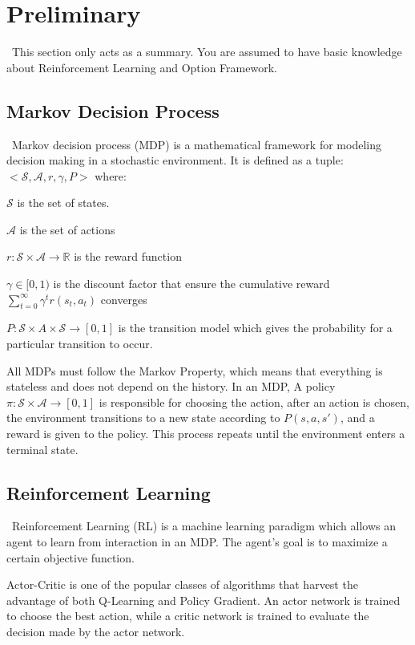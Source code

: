 \documentclass{article}
\begin{document}
	\section{Preliminary}
	\qquad \ This section only acts as a summary. You are assumed to have basic knowledge about Reinforcement Learning and Option Framework.
	\subsection*{Markov Decision Process}
	\qquad \ Markov decision process (MDP) \cite{sutton2018reinforcement} is a mathematical framework for modeling decision making in a stochastic environment. It is defined as a tuple: $<\mathcal{S}, \mathcal{A}, r, \gamma, P>$ where:
	
	$\mathcal{S}$ is the set of states.
	
	$\mathcal{A}$ is the set of actions
	
	$r : \mathcal{S} \times \mathcal{A} \rightarrow \mathbb{R}$ is the reward function
	
	$\gamma \in [0,1)$ is the discount factor that ensure the cumulative reward $\sum_{t=0}^{\infty} \gamma^t r(s_t, a_t)$ converges
	
	$P : \mathcal{S} \times A \times \mathcal{S} \rightarrow [0,1]$ is the transition model which gives the probability for a particular transition to occur.
	
	\quad All MDPs must follow the Markov Property, which means that everything is stateless and does not depend on the history. In an MDP, A policy $\pi : \mathcal{S} \times \mathcal{A} \rightarrow [0,1]$ is responsible for choosing the action, after an action is chosen, the environment transitions to a new state according to $P(s,a,s')$, and a reward is given to the policy. This process repeats until the environment enters a terminal state.
	\subsection*{Reinforcement Learning}
	\qquad \ Reinforcement Learning (RL) \cite{sutton2018reinforcement} is a machine learning paradigm which allows an agent to learn from interaction in an MDP. The agent's goal is to maximize a certain objective function.
	
	\quad Actor-Critic \cite{Konda00actor-criticalgorithms} is one of the popular classes of algorithms that harvest the advantage of both Q-Learning and Policy Gradient. An actor network is trained to choose the best action, while a critic network is trained to evaluate the decision made by the actor network.
\end{document}
